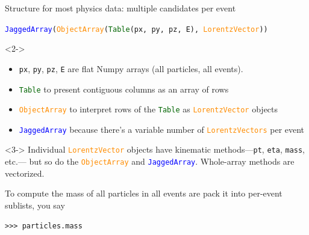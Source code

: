 \documentclass[aspectratio=169]{beamer}
\begin{document}
\begin{frame}[fragile]{Structure for most physics data: multiple candidates per event}
\vspace{0.4 cm}

\begin{center}
{\tt \small \textcolor{blue}{JaggedArray}(\textcolor{darkorange}{ObjectArray}(\textcolor{darkgreen}{Table}(px, py, pz, E), \textcolor{darkorange}{LorentzVector}))}
\end{center}

\begin{uncoverenv}<2->
\begin{itemize}
\item {\tt \small px}, {\tt \small py}, {\tt \small pz}, {\tt \small E} are flat Numpy arrays (all particles, all events).
\item \textcolor{darkgreen}{\tt \small Table} to present contiguous columns as an array of rows
\item \textcolor{darkorange}{\tt \small ObjectArray} to interpret rows of the \textcolor{darkgreen}{\tt \small Table} as \textcolor{darkorange}{\tt \small LorentzVector} objects
\item \textcolor{blue}{\tt \small JaggedArray} because there's a variable number of \textcolor{darkorange}{\tt \small LorentzVectors} per event
\end{itemize}
\end{uncoverenv}

\begin{uncoverenv}<3->
\vspace{0.5 cm}
Individual \textcolor{darkorange}{\tt \small LorentzVector} objects have kinematic methods---{\tt \small pt}, {\tt \small eta}, {\tt \small mass}, etc.--- but so do the \textcolor{darkorange}{\tt \small ObjectArray} and \textcolor{blue}{\tt \small JaggedArray}. Whole-array methods are vectorized.

\vspace{0.25 cm}
To compute the mass of all particles in all events are pack it into per-event sublists, you say

\small\begin{verbatim}
>>> particles.mass
\end{verbatim}
\end{uncoverenv}
\end{frame}
\end{document}
